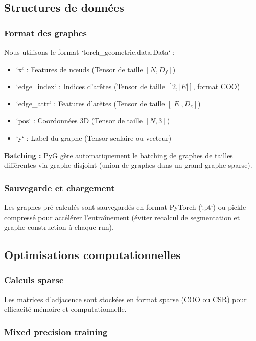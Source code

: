 \subsection{Structures de données}

\subsubsection{Format des graphes}

Nous utilisons le format `torch_geometric.data.Data` :
\begin{itemize}
    \item `x` : Features de nœuds (Tensor de taille $[N, D_f]$)
    \item `edge_index` : Indices d'arêtes (Tensor de taille $[2, |E|]$, format COO)
    \item `edge_attr` : Features d'arêtes (Tensor de taille $[|E|, D_e]$)
    \item `pos` : Coordonnées 3D (Tensor de taille $[N, 3]$)
    \item `y` : Label du graphe (Tensor scalaire ou vecteur)
\end{itemize}

\textbf{Batching :}
PyG gère automatiquement le batching de graphes de tailles différentes via graphe disjoint (union de graphes dans un grand graphe sparse).

\subsubsection{Sauvegarde et chargement}

Les graphes pré-calculés sont sauvegardés en format PyTorch (`.pt`) ou pickle compressé pour accélérer l'entraînement (éviter recalcul de segmentation et graphe construction à chaque run).

\subsection{Optimisations computationnelles}

\subsubsection{Calculs sparse}

Les matrices d'adjacence sont stockées en format sparse (COO ou CSR) pour efficacité mémoire et computationnelle.

\subsubsection{Mixed precision training}


